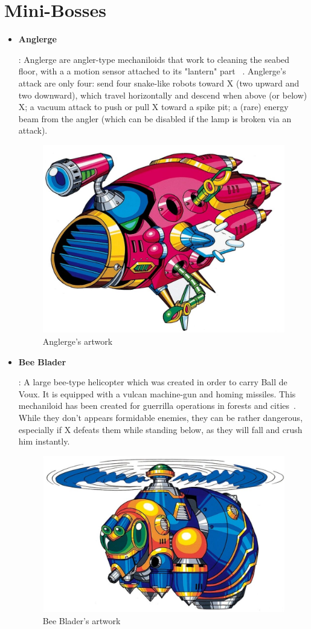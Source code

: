 \section{Mini-Bosses}
	\begin{itemize}
		\item \hypertarget{miniboss:Anglerge}{\textbf{Anglerge}}:
		Anglerge are angler-type mechaniloids that work to cleaning the seabed floor, with a  a motion sensor attached to its "lantern" part ~\cite{wayback:X_resources}. Anglerge's attack are only four: send four snake-like robots toward X (two upward and two downward), which travel horizontally and descend when above (or below) X; a vacuum attack to push or pull X toward a spike pit; a (rare) energy beam from the angler (which can be disabled if the lamp is broken via an attack).
		\begin{figure}[htp]
			\centering
			\includegraphics[width=0.5\linewidth]{figures/X1/enemies/Anglerge.jpg}
			\caption{Anglerge's artwork}
		\end{figure}
	
		\item \hypertarget{miniboss:Bee_Blader}{\textbf{Bee Blader}}:
		A large bee-type helicopter which was created in order to carry Ball de Voux. It is equipped with a vulcan machine-gun and homing missiles. This mechaniloid has been created for guerrilla operations in forests and cities~\cite{wayback:X_resources}. While they don't appears formidable enemies, they can be rather dangerous, especially if X defeats them while standing below, as they will fall and crush him instantly.
		\begin{figure}[htp]
			\centering
			\includegraphics[width=0.6\linewidth]{figures/X1/enemies/BeeBlader.jpg}
			\caption{Bee Blader's artwork}
		\end{figure}
	

\end{itemize}
